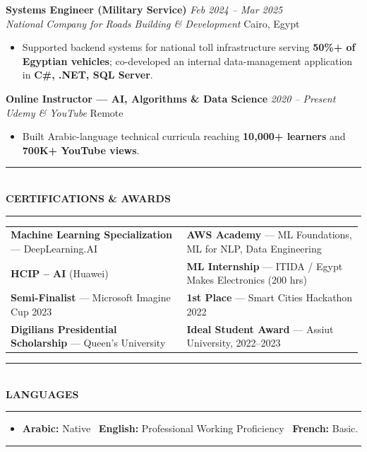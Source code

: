 \documentclass[10pt, a4paper]{article}
\makeatletter
\newcommand{\cvsection}[1]{%
  \vspace{3pt}%
  {\color{navy}\rule{\linewidth}{1.1pt}}\\[0.5pt]%
  {\color{navy}\bfseries\fontsize{9.5}{11}\selectfont\uppercase{#1}}\\[-4pt]%
  {\color{teal}\rule{\linewidth}{0.6pt}}%
  \vspace{2pt}%
}
\newcommand{\cventry}[4]{%
  \vspace{2.5pt}%
  \textbf{\color{darkgray}#1} \hfill {\color{midgray}\textit{#3}}\\[-1.5pt]%
  {\color{teal}\textit{#2}} \hfill {\color{midgray}#4}%
}
\newenvironment{cvitems}{%
  \begin{itemize}[leftmargin=11pt, itemsep=0.5pt, parsep=0pt, topsep=1pt,
                  label={\textcolor{teal}{$\bullet$}}]
}{%
  \end{itemize}%
}
\newenvironment{dualcol}{%
  \begin{tabular*}{\linewidth}{@{}p{0.495\linewidth}@{\hspace{0.01\linewidth}}p{0.495\linewidth}@{}}
}{%
  \end{tabular*}%
}
\makeatother
\begin{document}
\cventry{Systems Engineer (Military Service)}{National Company for Roads Building \& Development}
        {Feb 2024 -- Mar 2025}{Cairo, Egypt}
\begin{cvitems}
  \item Supported backend systems for national toll infrastructure serving \textbf{50\%+ of Egyptian vehicles}; co-developed an internal data-management application in \textbf{C\#, .NET, SQL Server}.
\end{cvitems}

\cventry{Online Instructor --- AI, Algorithms \& Data Science}{Udemy \& YouTube}
        {2020 -- Present}{Remote}
\begin{cvitems}
  \item Built Arabic-language technical curricula reaching \textbf{10,000+ learners} and \textbf{700K+ YouTube views}.
\end{cvitems}

\cvsection{Certifications \& Awards}

\begin{dualcol}
  \textbf{Machine Learning Specialization} --- DeepLearning.AI &
  \textbf{AWS Academy} --- ML Foundations, ML for NLP, Data Engineering \\[2pt]
  \textbf{HCIP -- AI} (Huawei) &
  \textbf{ML Internship} --- ITIDA / Egypt Makes Electronics (200 hrs) \\[2pt]
  \textbf{Semi-Finalist} --- Microsoft Imagine Cup 2023 &
  \textbf{1st Place} --- Smart Cities Hackathon 2022 \\[2pt]
  \textbf{Digilians Presidential Scholarship} --- Queen's University &
  \textbf{Ideal Student Award} --- Assiut University, 2022--2023 \\
\end{dualcol}

\cvsection{Languages}

\begin{cvitems}
  \item \textbf{Arabic:} Native \textperiodcentered\ \textbf{English:} Professional Working Proficiency \textperiodcentered\ \textbf{French:} Basic.
\end{cvitems}

\vspace{3pt}
{\color{navy}\rule{\linewidth}{0.8pt}}
\end{document}
